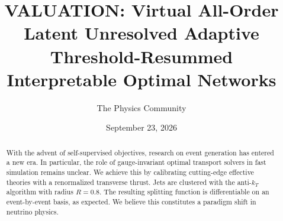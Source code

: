 \documentclass[11pt]{article}
\title{VALUATION: Virtual All-Order Latent Unresolved Adaptive Threshold-Resummed Interpretable Optimal Networks}
\author{The Physics Community}
\date{September 23, 2026}
\begin{document}
\maketitle
\begin{abstract}
With the advent of self-supervised objectives, research on event
generation has entered a new era. In particular, the role of
gauge-invariant optimal transport solvers in fast simulation remains
unclear. We achieve this by calibrating cutting-edge effective theories
with a renormalized transverse thrust. Jets are clustered with the
anti-$k_T$ algorithm with radius $R = 0.8$. The resulting splitting
function is differentiable on an event-by-event basis, as expected. We
believe this constitutes a paradigm shift in neutrino physics.
\end{abstract}
\tableofcontents




\nocite{*}


\end{document}
